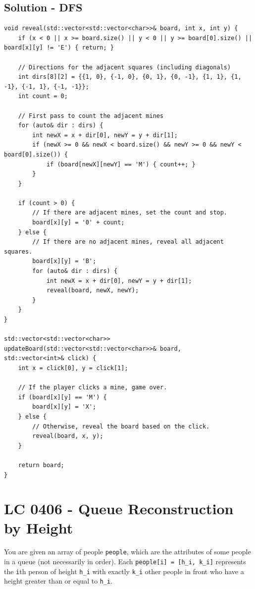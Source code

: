 \subsection*{Solution - DFS}
\begin{lstlisting}
void reveal(std::vector<std::vector<char>>& board, int x, int y) {
	if (x < 0 || x >= board.size() || y < 0 || y >= board[0].size() || board[x][y] != 'E') { return; }
	
	// Directions for the adjacent squares (including diagonals)
	int dirs[8][2] = {{1, 0}, {-1, 0}, {0, 1}, {0, -1}, {1, 1}, {1, -1}, {-1, 1}, {-1, -1}};
	int count = 0;
	
	// First pass to count the adjacent mines
	for (auto& dir : dirs) {
		int newX = x + dir[0], newY = y + dir[1];
		if (newX >= 0 && newX < board.size() && newY >= 0 && newY < board[0].size()) {
			if (board[newX][newY] == 'M') { count++; }
		}
	}
	
	if (count > 0) {
		// If there are adjacent mines, set the count and stop.
		board[x][y] = '0' + count;
	} else {
		// If there are no adjacent mines, reveal all adjacent squares.
		board[x][y] = 'B';
		for (auto& dir : dirs) {
			int newX = x + dir[0], newY = y + dir[1];
			reveal(board, newX, newY);
		}
	}
}

std::vector<std::vector<char>> updateBoard(std::vector<std::vector<char>>& board,
std::vector<int>& click) {
	int x = click[0], y = click[1];
	
	// If the player clicks a mine, game over.
	if (board[x][y] == 'M') {
		board[x][y] = 'X';
	} else {
		// Otherwise, reveal the board based on the click.
		reveal(board, x, y);
	}
	
	return board;
}
\end{lstlisting}

\section{LC 0406 - Queue Reconstruction by Height}
You are given an array of people {\colorbox{CodeBackground}{\lstinline|people|}}, which are the attributes of some people in a queue (not necessarily in order). Each {\colorbox{CodeBackground}{\lstinline|people[i] = [h_i, k_i]|}} represents the {\colorbox{CodeBackground}{\lstinline|i|}}th person of height {\colorbox{CodeBackground}{\lstinline|h_i|}} with exactly {\colorbox{CodeBackground}{\lstinline|k_i|}} other people in front who have a height greater than or equal to {\colorbox{CodeBackground}{\lstinline|h_i|}}.\\


